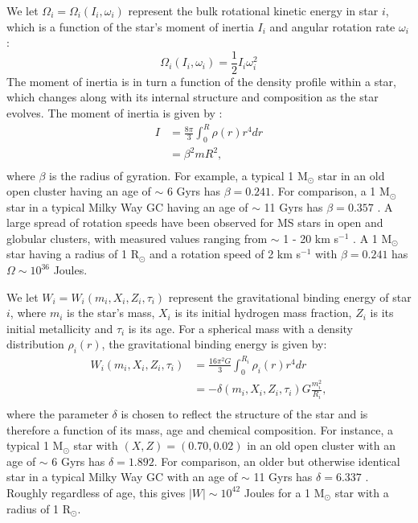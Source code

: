 We let $\Omega_i = \Omega_i(I_i,\omega_i)$ represent the
bulk rotational kinetic energy in star $i$, which is a function of the star's
moment of inertia $I_i$ and angular rotation rate $\omega_i$:
\begin{equation}
\label{eqn:Omega}
\Omega_i(I_i,\omega_i) = \frac{1}{2}I_i\omega_i^2
\end{equation} 
The moment of inertia is in turn a function of the density profile within a
star, which changes along with its internal structure and composition
as the star evolves.  The moment of inertia is given by \citep{claret89}: 
\begin{equation}
\begin{split}
\label{eqn:mom-inertia}
I &= \frac{8{\pi}}{3}\int_{0}^{R} \rho(r)r^4dr \\
  &= \beta^2mR^2, \\
\end{split}
\end{equation}
where $\beta$ is the radius of gyration.  For example, a typical 1 M$_{\odot}$
star in an old open cluster having an age of $\sim$ 6 Gyrs has $\beta
= 0.241$.  For comparison, a 1 M$_{\odot}$ star in a
typical Milky Way GC having an age of $\sim$ 11 Gyrs has $\beta =
0.357$ \citep{claret89}.  A large spread of rotation speeds have been
observed for MS stars in 
open and globular clusters, with measured values ranging from  $\sim$ 1 -
20 km s$^{-1}$ \citep{mathieu09}.  A 1 M$_{\odot}$
star having a radius of 1 R$_{\odot}$ and a rotation speed of 2 km
s$^{-1}$ with $\beta=0.241$ has $\Omega \sim 10^{36}$ Joules.

We let $W_i = W_i(m_i,X_i,Z_i,\tau_i)$ represent the gravitational
binding energy 
of star $i$, where $m_i$ is the star's mass, $X_i$ is its initial
hydrogen mass fraction, $Z_i$ is its initial metallicity and $\tau_i$
is its age.  For a spherical mass with a density distribution
$\rho_i(r)$, the gravitational binding energy is given by:
\begin{equation}
\begin{split}
\label{eqn:binding}
W_i(m_i,X_i,Z_i,\tau_i) &= \frac{16\pi^2G}{3}\int_0^{R_i}
\rho_i(r)r^4dr \\
                        &= -{\delta}(m_i,X_i,Z_i,\tau_i)G\frac{m_i^2}{R_i}, \\
\end{split}
\end{equation}
where the parameter $\delta$ is chosen to reflect the structure of the
star and is therefore a function of its mass, age and chemical
composition.  For instance, a typical 1 M$_{\odot}$
star with $(X,Z) = (0.70,0.02)$ in an old open cluster with an age
of $\sim$ 6 Gyrs has $\delta = 1.892$.  For
comparison, an older but otherwise identical star in a typical Milky
Way GC with an age of $\sim$ 11 Gyrs has $\delta = 6.337$
\citep{claret89}.  Roughly regardless of age, this gives $|W| \sim 10^{42}$
Joules for a 1 M$_{\odot}$ star with a radius of 1 R$_{\odot}$.

